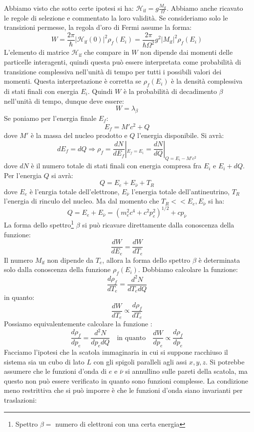 Abbiamo visto che sotto certe ipotesi si ha: $\mathcal{H}_{\text{if}}=g\frac{M_{\text{if}}}{\Omega}$.
Abbiamo anche ricavato le regole di selezione e commentato la loro validità. Se
consideriamo solo le transizioni permesse, la regola d'oro di Fermi assume la
forma:
\[
W=\frac{2\pi}{\hbar}|\mathcal{H}_{\text{if}}(0)|^2\rho_f(E_i)=\frac{2\pi}{\hbar\Omega^2}g^2|M_{\text{if}}|^2\rho_f(E_i)
\]
L'elemento di matrice $\mathcal{H}_{\text{if}}$ che compare in $W$ non dipende
dai momenti delle particelle interagenti, quindi questa può essere interpretata
come probabilità di transizione
complessiva nell'unità di tempo per tutti i possibili valori dei momenti. Questa
interpretazione è corretta se $\rho_f(E_i)$ è la densità complessiva di stati
finali con energia $E_i$.
Quindi $W$ è la probabilità di decadimento $\beta$ nell'unità di tempo, dunque deve essere:
\[
W=\lambda_{\beta}
\]
Se poniamo per l'energia finale $E_f$:
\[
E_f=M'c^2+Q
\]
dove $M'$ è la massa del nucleo prodotto e $Q$ l'energia disponibile. Si avrà:
\[
dE_f=dQ\Rightarrow\rho_f=\frac{dN}{dE_f}|_{E_f=E_i}=\frac{dN}{dQ}|_{Q=E_i-M'c^2}
\]
dove $dN$ è il numero totale di stati finali con energia compresa fra $E_i$ e
$E_i+dQ$. Per l'energia $Q$ si avrà:
\[
Q=E_e+E_{\bar{\nu}}+T_R
\]
dove $E_e$ è l'enrgia totale dell'elettrone, $E_{\bar{\nu}}$ l'energia totale
dell'antineutrino, $T_R$ l'energia di rinculo del nucleo.
Ma dal momento che $T_R<<E_e,E_{\bar{\nu}}$ si ha:
\[
Q=E_e+E_{\bar{\nu}}=(m_e^2c^4+c^2p_e^2)^{1/2}+cp_{\bar{\nu}}
\]
La forma dello spettro\footnote{Spettro $\beta=$ numero di elettroni con una
certa energia} $\beta$ si può ricavare direttamente dalla conoscenza della
funzione:
\[
\frac{dW}{dE_e}=\frac{dW}{dT_e}
\]
Il numero $M_{\text{if}}$ non dipende da $T_e$, allora la forma dello spettro
$\beta$ è determinata solo dalla conoscenza della funzione $\rho_f(E_i)$.
Dobbiamo calcolare la funzione:
\[
\frac{d\rho_f}{dT_e}=\frac{d^2N}{dT_edQ}
\]
in quanto:
\[
\frac{dW}{dT_e}\propto\frac{d\rho_f}{dT_e}
\]
Possiamo equivalentemente calcolare la funzione :
\[
\frac{d\rho_f}{dp_e}=\frac{d^2N}{dp_edQ}\quad\text{in quanto}\quad\frac{dW}{dp_e}\propto\frac{d\rho_f}{dp_e}
\]
Facciamo l'ipotesi che la scatola immaginaria in cui si suppone racchiuso il sistema sia un cubo di lato $L$ con gli spigoli paralleli agli assi $x,y,z$. Si potrebbe assumere che le
funzioni d'onda di $e$ e $\bar{\nu}$ si annullino sulle pareti della scatola, ma questo non può essere verificato in quanto sono funzioni complesse. La condizione meno restrittiva che si può
imporre è che le funzioni d'onda siano invarianti per traslazioni:
